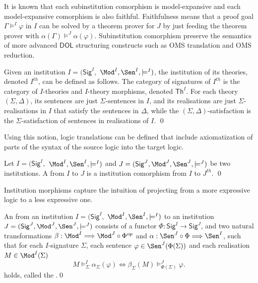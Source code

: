 \documentclass[10pt, a4paper]{isov2}
\newcommand{\Sig}{\mathsf{Sig}}
\renewcommand{\Th}{\mathsf{Th}}
\newcommand*{\DOL}{\ensuremath{\mathsf{DOL}}\xspace}
\begin{document}
It is known that each subinstitution comorphism is model-expansive and 
each model-expansive comorphism
is also faithful.
Faithfulness means that a proof goal $\Gamma\models^I\varphi$
in $I$ can be solved by a theorem prover for $J$ by just feeding the
theorem prover with $\alpha(\Gamma)\models^J\alpha(\varphi)$.
Subinstitution comorphism preserve
the semantics of more advanced \DOL structuring constructs such
as OMS translation and OMS reduction.


\begin{definition}
  Given an institution  $I = (\Sig^I,$ $ \Mod^I, \Sen^I, \models^I)$, the
   institution of its theories, denoted $I^{th}$, can be defined as follows. The category of signatures of $I^{th}$ is the category
   of $I$-theories and $I$-theory morphisms, denoted $\Th^I$.
   For each theory $(\Sigma, \Delta)$, its sentences are just $\Sigma$-sentences in $I$, and
   its realisations are just $\Sigma$-realisations in $I$ that satisfy the sentences in $\Delta$, while the
   $(\Sigma,\Delta)$-satisfaction is the $\Sigma$-satisfaction of sentences in realisations of $I$.
\qed \end{definition}

Using this notion, logic translations can be defined that include axiomatization of parts of the
syntax of the source logic into the target logic.

\begin{definition}

 Let $I = (\Sig^I,$ $ \Mod^I, \Sen^I, \models^I)$ and $J = (\Sig^J, \Mod^J,
\Sen^J, \models^J)$ be two institutions. A  from $I$ to
$J$ is a institution comorphism from $I$ to $J^{th}$.
\qed\end{definition}

\medskip

Institution morphisms capture the intuition of projecting from a more expressive logic to a less expressive one.

\begin{definition} 
An  from an institution $I = (\Sig^I,$ $ \Mod^I, \Sen^I, \models^I)$ to
an institution $J = (\Sig^J, \Mod^J,
\Sen^J, \models^J)$ consists of a functor $\Phi : \Sig^I \longrightarrow \Sig^J$, and two
natural transformations $\beta: \Mod^I \Longrightarrow \Mod^J \circ \Phi^{op}$
and $\alpha:  \Sen^J \circ \Phi \Longrightarrow \Sen^I $, such that for each $I$-signature $\Sigma$, each sentence $\varphi\in\Sen^J(\Phi(\Sigma))$ and each realisation $M\in\Mod^I(\Sigma)$
%
\begin{equation*}
  M\models^{I}_{\Sigma}\alpha_{\Sigma}(\varphi)
\iff
  \beta_{\Sigma}(M)\models^J_{\Phi(\Sigma)}\varphi.
\end{equation*}
holds, called the .\quad\qed
\end{definition}
\end{document}
